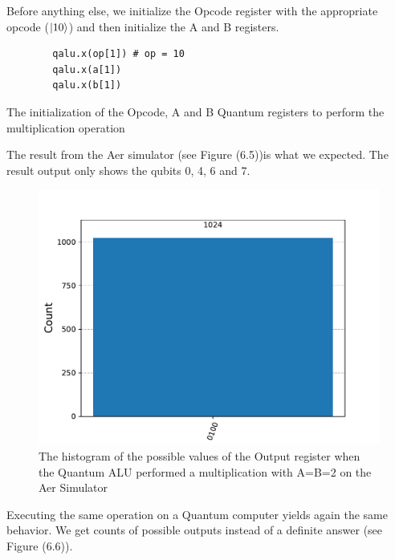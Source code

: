 Before anything else, we initialize the Opcode register with the appropriate opcode ($\ket{10}$) and then initialize the A and B registers.

\begin{listing}[!ht]
    \centering
    \begin{verbatim}
        qalu.x(op[1]) # op = 10
        qalu.x(a[1])
        qalu.x(b[1])
    \end{verbatim}
    \caption{The initialization of the Opcode, A and B Quantum registers to perform the multiplication operation}
\end{listing}

The result from the Aer simulator (see Figure (6.5))is what we expected. The result output only shows the qubits 0, 4, 6 and 7.

\begin{figure}[!ht]
    \centering
    \includegraphics[scale=0.7]{images/6_Complete_System/multiplier_aer_result.pdf}
    \caption{The histogram of the possible values of the Output register when the Quantum ALU performed a multiplication with A=B=2 on the Aer Simulator}
\end{figure}

Executing the same operation on a Quantum computer yields again the same behavior. We get counts of possible outputs instead of a definite answer (see Figure (6.6)).


